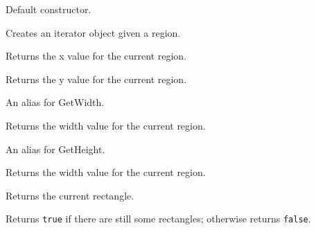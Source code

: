 
\label{wxregioniteratorctor}


Default constructor.


Creates an iterator object given a region.

\label{wxregioniteratorgetx}


Returns the x value for the current region.

\label{wxregioniteratorgety}


Returns the y value for the current region.

\label{wxregioniteratorgetw}


An alias for GetWidth.

\label{wxregioniteratorgetwidth}


Returns the width value for the current region.

\label{wxregioniteratorgeth}


An alias for GetHeight.

\label{wxregioniteratorgetheight}


Returns the width value for the current region.

\label{wxregioniteratorgetrect}


Returns the current rectangle.

\label{wxregioniteratorhaverects}


Returns {\tt true} if there are still some rectangles; otherwise returns {\tt false}.


